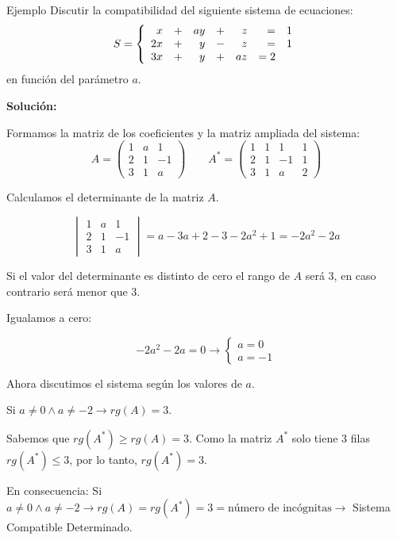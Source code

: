 \documentclass[9pt]{beamer}
\newenvironment{sistematres}{\left\lbrace \begin{array}{rrrrrrr}}{\end{array} \right.}
\begin{document}
\begin{frame}
\begin{exampleblock}{Ejemplo}
Discutir la compatibilidad del siguiente sistema de ecuaciones:
\[
S=\begin{sistematres}
	x & + & ay & + & z & = & 1 \\
	2x & + & y & - & z & = & 1 \\
	3x & + & y & + & az & = 2 
\end{sistematres}
\]
en función del parámetro $a$.
\end{exampleblock}

\pause
\textbf{Solución:}

Formamos la matriz de los coeficientes y la matriz ampliada del sistema:
\[
A=\begin{pmatrix}
	1 & a & 1 \\
	2 & 1 & -1 \\
	3 & 1 & a
\end{pmatrix}
\qquad
A^{*}=\begin{pmatrix}
	1 & 1 & 1 & 1 \\
	2 & 1 & -1 & 1 \\
	3 & 1 & a & 2
\end{pmatrix} 
\]

\pause
Calculamos el determinante de la matriz $A$. 

\[ \begin{vmatrix}
	1 & a & 1 \\
	2 & 1 & -1 \\
	3 & 1 & a
\end{vmatrix}= a-3a+2-3-2a^2+1=-2a^2-2a
\]
\end{frame}

\begin{frame}
Si el valor del determinante es distinto de cero el rango de $A$ será $3$, en caso contrario será menor que $3$.

\pause
Igualamos a cero:

\[ -2a^2-2a=0 \rightarrow \left\lbrace \begin{array}{l} a=0 \\ a=-1 \end{array} \right. \]
\pause

Ahora discutimos el sistema según los valores de $a$.

Si $a\neq 0 \wedge a \neq -2\rightarrow rg(A)=3$. 

\pause
Sabemos que $rg(A^*)\geq rg(A) =3$. Como la matriz $A^*$ solo tiene $3$ filas $rg(A^*)\leq 3$, por lo tanto, $rg(A^*)=3$.

\pause
En consecuencia: Si $a \neq 0  \wedge a \neq -2 \rightarrow rg(A)=rg(A^*)=3=\text{número de incógnitas} \rightarrow $ Sistema Compatible Determinado.
\end{frame}
\end{document}
